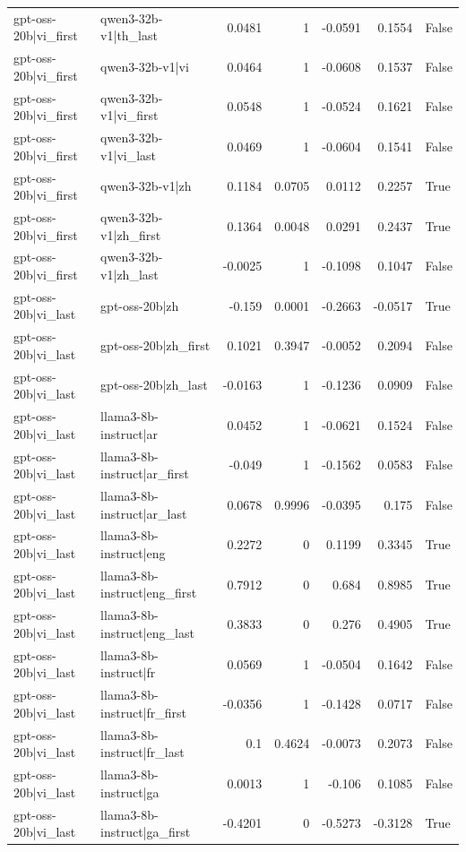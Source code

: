 \begin{table}
\begin{tabular}{l l r r r r l}
gpt-oss-20b|vi_first & qwen3-32b-v1|th_last & 0.0481 & 1 & -0.0591 & 0.1554 & False \\
gpt-oss-20b|vi_first & qwen3-32b-v1|vi & 0.0464 & 1 & -0.0608 & 0.1537 & False \\
gpt-oss-20b|vi_first & qwen3-32b-v1|vi_first & 0.0548 & 1 & -0.0524 & 0.1621 & False \\
gpt-oss-20b|vi_first & qwen3-32b-v1|vi_last & 0.0469 & 1 & -0.0604 & 0.1541 & False \\
gpt-oss-20b|vi_first & qwen3-32b-v1|zh & 0.1184 & 0.0705 & 0.0112 & 0.2257 & True \\
gpt-oss-20b|vi_first & qwen3-32b-v1|zh_first & 0.1364 & 0.0048 & 0.0291 & 0.2437 & True \\
gpt-oss-20b|vi_first & qwen3-32b-v1|zh_last & -0.0025 & 1 & -0.1098 & 0.1047 & False \\
gpt-oss-20b|vi_last & gpt-oss-20b|zh & -0.159 & 0.0001 & -0.2663 & -0.0517 & True \\
gpt-oss-20b|vi_last & gpt-oss-20b|zh_first & 0.1021 & 0.3947 & -0.0052 & 0.2094 & False \\
gpt-oss-20b|vi_last & gpt-oss-20b|zh_last & -0.0163 & 1 & -0.1236 & 0.0909 & False \\
gpt-oss-20b|vi_last & llama3-8b-instruct|ar & 0.0452 & 1 & -0.0621 & 0.1524 & False \\
gpt-oss-20b|vi_last & llama3-8b-instruct|ar_first & -0.049 & 1 & -0.1562 & 0.0583 & False \\
gpt-oss-20b|vi_last & llama3-8b-instruct|ar_last & 0.0678 & 0.9996 & -0.0395 & 0.175 & False \\
gpt-oss-20b|vi_last & llama3-8b-instruct|eng & 0.2272 & 0 & 0.1199 & 0.3345 & True \\
gpt-oss-20b|vi_last & llama3-8b-instruct|eng_first & 0.7912 & 0 & 0.684 & 0.8985 & True \\
gpt-oss-20b|vi_last & llama3-8b-instruct|eng_last & 0.3833 & 0 & 0.276 & 0.4905 & True \\
gpt-oss-20b|vi_last & llama3-8b-instruct|fr & 0.0569 & 1 & -0.0504 & 0.1642 & False \\
gpt-oss-20b|vi_last & llama3-8b-instruct|fr_first & -0.0356 & 1 & -0.1428 & 0.0717 & False \\
gpt-oss-20b|vi_last & llama3-8b-instruct|fr_last & 0.1 & 0.4624 & -0.0073 & 0.2073 & False \\
gpt-oss-20b|vi_last & llama3-8b-instruct|ga & 0.0013 & 1 & -0.106 & 0.1085 & False \\
gpt-oss-20b|vi_last & llama3-8b-instruct|ga_first & -0.4201 & 0 & -0.5273 & -0.3128 & True \\

\end{tabular}
\end{table}
